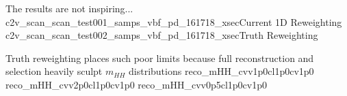 {The results are not inspiring...}
{c2v_scan_scan_test001_samps_vbf_pd_161718_xsec}{Current 1D Reweighting}
{c2v_scan_scan_test002_samps_vbf_pd_161718_xsec}{Truth Reweighting}


{   
    Truth reweighting places such poor limits because 
    full reconstruction and selection heavily sculpt $m_{HH}$ distributions
}
{reco_mHH_cvv1p0cl1p0cv1p0}
{reco_mHH_cvv2p0cl1p0cv1p0}
{reco_mHH_cvv0p5cl1p0cv1p0}
